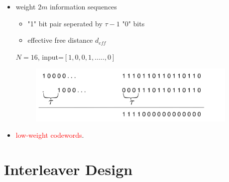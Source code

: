 \documentclass{beamer}  %
\begin{document}
\begin{frame}
\begin{itemize}
 
\setlength\itemsep{2em}

\frametitle{7. RSC Encoders and $\tau$-seperated weight 2m errors}

\item weight $2m$ information sequences 
\begin{itemize}
\item "1" bit pair seperated by $\tau -1$ "0" bits
\item effective free distance $d_{eff}$
\end{itemize}


\begin{example}
\centering
 $N=16$, input=$[1, 0, 0, 1,.....,0]$
\begin{figure}
		\includegraphics[width=0.95\textwidth]{RSCExample.pdf}
		
	\end{figure}
\end{example}
\item  \textcolor{red}{low-weight  codewords}.


\end{itemize}

\end{frame}

\section{Interleaver Design}
\end{document}
